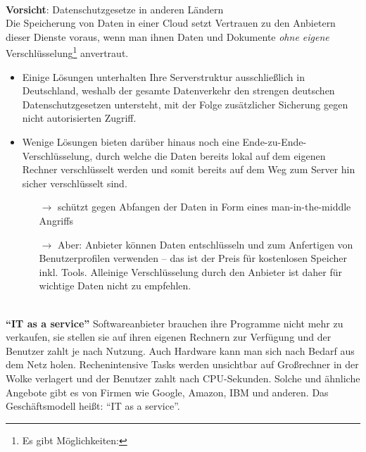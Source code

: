 ~\\
\textbf{Vorsicht}: Datenschutzgesetze in anderen Ländern\\
Die Speicherung von Daten in einer Cloud setzt Vertrauen zu den Anbietern dieser Dienste voraus, wenn man ihnen Daten und Dokumente \textit{ohne eigene} Verschlüsselung\footnote{Es gibt Möglichkeiten: } anvertraut.
\begin{itemize}
	\item Einige Lösungen unterhalten Ihre Serverstruktur ausschließlich in Deutschland, weshalb der gesamte Datenverkehr den strengen deutschen Datenschutzgesetzen untersteht, mit der Folge zusätzlicher Sicherung gegen nicht autorisierten Zugriff. 
	\item Wenige Lösungen bieten darüber hinaus noch eine Ende-zu-Ende-Verschlüsselung, durch welche die Daten bereits lokal auf dem eigenen Rechner verschlüsselt werden und somit bereits auf dem Weg zum Server hin sicher verschlüsselt sind. 
\begin{itemize}
	\item[$\to$] schützt gegen Abfangen der Daten in Form eines man-in-the-middle Angriffs
	\item[$\to$] Aber: Anbieter können Daten entschlüsseln und zum Anfertigen von Benutzerprofilen verwenden -- das ist der Preis für kostenlosen Speicher inkl. Tools. Alleinige Verschlüsselung durch den Anbieter ist daher für wichtige Daten nicht zu empfehlen. 
\end{itemize}
\end{itemize}
~\\
\textbf{``IT as a service''} 
Softwareanbieter brauchen ihre Programme nicht mehr zu verkaufen, sie stellen
sie auf ihren eigenen Rechnern zur Verfügung und der Benutzer zahlt je nach Nutzung. Auch Hardware kann man sich nach Bedarf aus dem Netz holen. Rechenintensive Tasks werden unsichtbar auf Großrechner in der Wolke verlagert und der Benutzer zahlt nach CPU-Sekunden. Solche und ähnliche Angebote gibt es von Firmen wie Google, Amazon, IBM und anderen. Das Geschäftsmodell heißt: ``IT as a service''.
%

